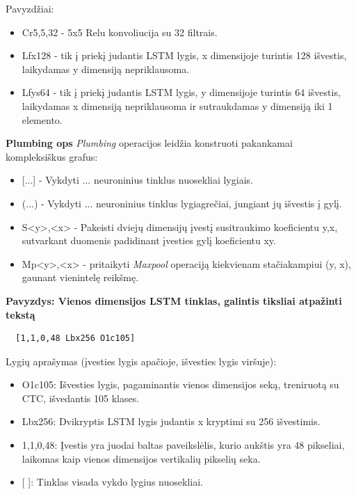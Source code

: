 \documentclass{VUMIFInfBakalaurinis}
\begin{document}
Pavyzdžiai:

\begin{itemize}
  \item Cr5,5,32 - 5x5 Relu konvoliucija su 32 filtrais.
  \item Lfx128 - tik į priekį judantis LSTM lygis, x dimensijoje turintis 128 išvestis, laikydamas y dimensiją nepriklausoma.
  \item Lfys64 - tik į priekį judantis LSTM lygis, y dimensijoje turintis 64 išvestis, laikydamas x dimensiją nepriklausoma ir sutraukdamas y dimensiją iki 1 elemento.
\end{itemize}

\textbf{Plumbing ops}
\textit{Plumbing} operacijos leidžia konstruoti pakankamai kompleksiškus grafus:

\begin{itemize}
  \item {[...]} - Vykdyti ... neuroninius tinklus nuosekliai lygiais.
  \item (...) - Vykdyti ... neuroninius tinklus lygiagrečiai, jungiant jų išvestis į gylį.
  \item S<y>,<x> - Pakeisti dviejų dimensijų įvestį susitraukimo koeficientu y,x, sutvarkant duomenis padidinant įvesties gylį koeficientu xy.
  \item Mp<y>,<x> - pritaikyti \textit{Maxpool} operaciją kiekvienam stačiakampiui (y, x), gaunant vienintelę reikšmę.
\end{itemize}

\textbf{Pavyzdys: Vienos dimensijos LSTM tinklas, galintis tiksliai atpažinti tekstą}

\begin{verbatim}
  [1,1,0,48 Lbx256 O1c105]
\end{verbatim}

Lygių aprašymas (įvesties lygis apačioje, išvesties lygis viršuje):

\begin{itemize}
  \item O1c105: Išvesties lygis, pagaminantis vienos dimensijos seką, treniruotą su CTC, išvedantis 105 klases.
  \item Lbx256: Dvikryptis LSTM lygis judantis x kryptimi su 256 išvestimis.
  \item 1,1,0,48: Įvestis yra juodai baltas paveikslėlis, kurio aukštis yra 48 pikseliai, laikomas kaip vienos dimensijos vertikalių pikselių seka.
  \item {[ ]}: Tinklas visada vykdo lygius nuosekliai.
\end{itemize}
\end{document}
